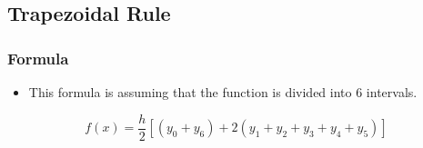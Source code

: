 \subsection{Trapezoidal Rule}

\subsubsection{Formula}
\begin{itemize}
    \item This formula is assuming that the function is divided into $6$ intervals.
\end{itemize}
\[ f(x) = \frac{h}{2}[(y_0 + y_6) + 2( y_1 + y_2 + y_3 + y_4 + y_5 )] \]